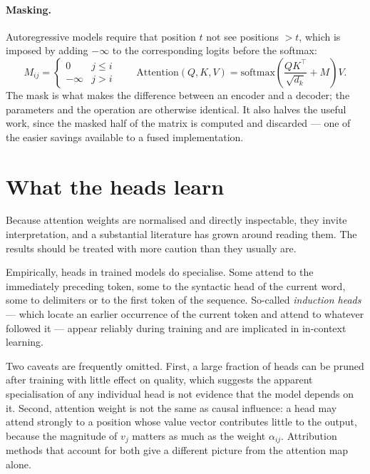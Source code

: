 \documentclass[11pt,a4paper]{article}
\begin{document}
\paragraph{Masking.}
Autoregressive models require that position $t$ not see positions $> t$, which
is imposed by adding $-\infty$ to the corresponding logits before the softmax:
\begin{equation}
  M_{ij} = \begin{cases}
    0 & j \le i \\
    -\infty & j > i
  \end{cases}
  \qquad
  \mathrm{Attention}(Q,K,V) =
    \mathrm{softmax}\!\left(\frac{QK^{\top}}{\sqrt{d_k}} + M\right)V.
\end{equation}
The mask is what makes the difference between an encoder and a decoder; the
parameters and the operation are otherwise identical. It also halves the useful
work, since the masked half of the matrix is computed and discarded --- one of
the easier savings available to a fused implementation.

\section{What the heads learn}
\label{sec:interpretability}

Because attention weights are normalised and directly inspectable, they invite
interpretation, and a substantial literature has grown around reading them.
The results should be treated with more caution than they usually are.

Empirically, heads in trained models do specialise. Some attend to the
immediately preceding token, some to the syntactic head of the current word,
some to delimiters or to the first token of the sequence. So-called
\emph{induction heads} --- which locate an earlier occurrence of the current
token and attend to whatever followed it --- appear reliably during training
and are implicated in in-context learning.

Two caveats are frequently omitted. First, a large fraction of heads can be
pruned after training with little effect on quality, which suggests the
apparent specialisation of any individual head is not evidence that the model
depends on it. Second, attention weight is not the same as causal influence: a
head may attend strongly to a position whose value vector contributes little
to the output, because the magnitude of $v_j$ matters as much as the weight
$\alpha_{ij}$. Attribution methods that account for both give a different
picture from the attention map alone.
\end{document}
